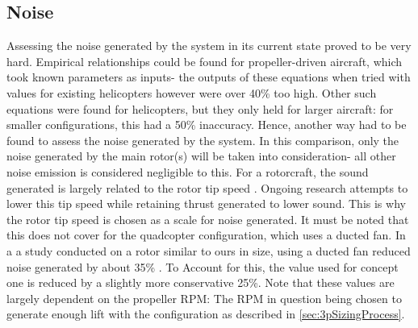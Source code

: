 \subsection{Noise}
Assessing the noise generated by the system in its current state proved to be very hard. Empirical relationships could be found for propeller-driven aircraft, which took known parameters as inputs- the outputs of these equations when tried with values for existing helicopters however were over 40\% too high. Other such equations were found for helicopters, but they only held for larger aircraft: for smaller configurations, this had a 50\% inaccuracy. Hence, another way had to be found to assess the noise generated by the system.
In this comparison, only the noise generated by the main rotor(s) will be taken into consideration- all other noise emission is considered negligible to this. For a rotorcraft, the sound generated is largely related to the rotor tip speed \cite{quietheli}. Ongoing research attempts to lower this tip speed while retaining thrust generated to lower sound. This is why the rotor tip speed is chosen as a scale for noise generated. It must be noted that this does not cover for the quadcopter configuration, which uses a ducted fan. In a a study conducted on a rotor similar to ours in size, using a ducted fan reduced noise generated by about 35\% \cite{ductedFanNoise}. To Account for this, the value used for concept one is reduced by a slightly more conservative 25\%.
Note that these values are largely dependent on the propeller RPM: The RPM in question being chosen to generate enough lift with the configuration as described in \autoref{sec:3pSizingProcess}.

